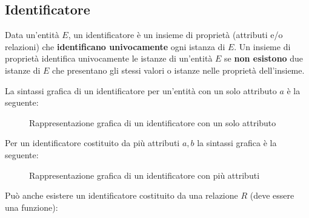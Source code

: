 \documentclass[a4paper]{article}
\begin{document}
\subsection{Identificatore}
Data un'entità \( E \), un identificatore è un insieme di proprietà (attributi e/o relazioni)
che \textbf{identificano univocamente} ogni istanza di \( E \). Un insieme di proprietà
identifica univocamente le istanze di un'entità \( E \) se \textbf{non esistono} due
istanze di \( E \) che presentano gli stessi valori o istanze nelle proprietà dell'insieme.

\vspace{1em}
\noindent
La sintassi grafica di un identificatore per un'entità con un solo attributo \( a \) è
la seguente:
\begin{figure}[H]
  \centering
  \caption{Rappresentazione grafica di un identificatore con un solo attributo}
\end{figure}
\noindent
Per un identificatore costituito da più attributi \( a, b \) la sintassi grafica è la seguente:
\begin{figure}[H]
  \centering
  \caption{Rappresentazione grafica di un identificatore con più attributi}
\end{figure}
\noindent
Può anche esistere un identificatore costituito da una relazione \( R \) (deve essere
una funzione):
\end{document}
